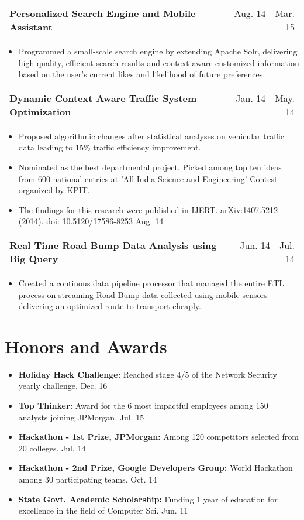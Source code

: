 \documentclass[a4paper,10pt]{article}
\makeatletter
\newcommand{\projectHeading}[2]{
    \begin{tabular*}{1\textwidth}{l@{\extracolsep{\fill}}r}
      \large{\textbf{#1}} & \small{#2} 
    \end{tabular*}
}
\newcommand{\resumeItemListStart}{\begin{itemize}[topsep=3pt, parsep=1pt, listparindent=0pt, itemindent=0pt, itemsep=0.5pt, leftmargin=*]}
\newcommand{\resumeItemListEnd}{\end{itemize}}
\makeatother
\begin{document}
   \projectHeading{Personalized Search Engine and Mobile Assistant}{Aug. 14 - Mar. 15} 
    \resumeItemListStart
       \item\small{Programmed a small-scale search engine by extending Apache Solr, delivering high quality, efficient search results and context aware customized information based on the user's current likes and likelihood of future preferences.}
     \resumeItemListEnd
   
   \projectHeading{Dynamic Context Aware Traffic System Optimization}{Jan. 14 - May. 14} 
    \resumeItemListStart
       \item\small{Proposed algorithmic changes after statistical analyses on vehicular traffic data leading to 15\% traffic efficiency improvement.}
       \item\small{Nominated as the best departmental project. Picked among top ten ideas from 600 national entries at 'All India Science and Engineering' Contest organized by KPIT.}
       \item\small{The findings for this research were published in IJERT. arXiv:1407.5212 (2014). doi: 10.5120/17586-8253 Aug. 14}
     \resumeItemListEnd

   \projectHeading{Real Time Road Bump Data Analysis using Big Query}{Jun. 14 - Jul. 14} 
    \resumeItemListStart
      \item\small{Created a continous data pipeline processor that managed the entire ETL process on streaming Road Bump data collected using mobile sensors delivering an optimized route to transport cheaply.}
     \resumeItemListEnd
   
 
\section{Honors and Awards}
  \resumeItemListStart
    \item\small{\textbf{Holiday Hack Challenge: }
  	  {Reached stage 4/5 of the Network Security yearly challenge.}\hfill{} {Dec. 16}}
    \item\small{\textbf{Top Thinker: }
      {Award for the 6 most impactful employees among 150 analysts joining JPMorgan.}\hfill{} {Jul. 15}}
    \item\small{\textbf{Hackathon - 1st Prize, JPMorgan: }
      {Among 120 competitors selected from 20 colleges.}\hfill{} {Jul. 14}}
    \item\small{\textbf{Hackathon - 2nd Prize, Google Developers Group: }
      {World Hackathon among 30 participating teams.}\hfill{} {Oct. 14}}
    \item\small{\textbf{State Govt. Academic Scholarship: }
    {Funding 1 year of education for excellence in the field of Computer Sci.}\hfill{} {Jun. 11}}
  \resumeItemListEnd
\end{document}
